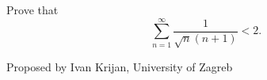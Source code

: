 Prove that
\[\sum\limits_{n = 1}^{\infty}\frac{1}{\sqrt{n}\left(n+1\right)} < 2.\]

Proposed by Ivan Krijan, University of Zagreb
